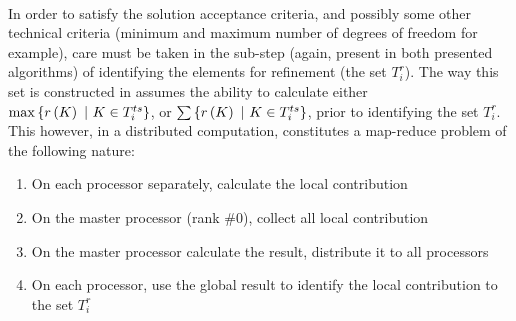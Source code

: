 \paragraph{}
In order to satisfy the solution acceptance criteria, and possibly some other technical criteria (minimum and maximum number of degrees of freedom for example), care must be taken in the sub-step (again, present in both presented algorithms) of identifying the elements for refinement (the set $T^{r}_i$). The way this set is constructed in  assumes the ability to calculate either $\max\left\{r\left( K\right)\ |\ K \in T^{ts}_i\right\}$, or $\sum\left\{r\left( K\right)\ |\ K \in T^{ts}_i\right\}$, prior to identifying the set $T^{r}_i$. This however, in a distributed computation, constitutes a map-reduce problem of the following nature:
\begin{enumerate}
\item On each processor separately, calculate the local contribution
\item On the master processor (rank \#0), collect all local contribution
\item On the master processor calculate the result, distribute it to all processors
\item On each processor, use the global result to identify the local contribution to the set $T^{r}_i$
\end{enumerate}